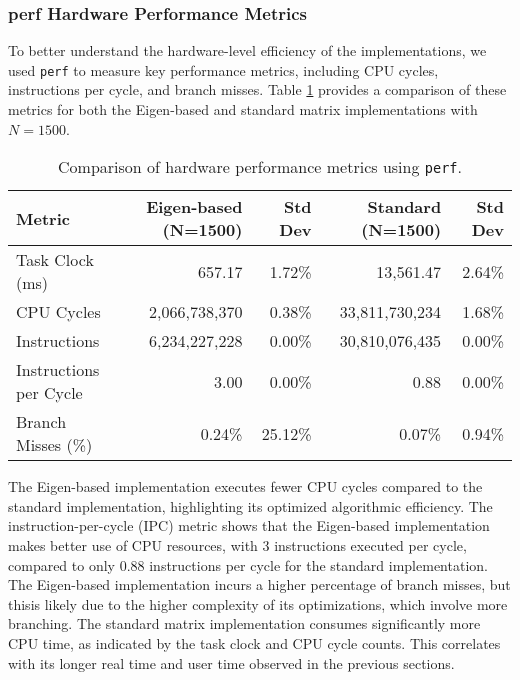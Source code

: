 \documentclass{article}
\begin{document}
    \subsubsection{perf Hardware Performance Metrics}

    To better understand the hardware-level efficiency of the implementations, we used \texttt{perf}
    to measure key performance metrics, including CPU cycles, instructions per cycle, and branch
    misses. Table \ref{tab:perf} provides a comparison of these metrics for both the Eigen-based and
    standard matrix implementations with $N=1500$.

    \begin{table}[h!]
        \centering
        \begin{tabular}{|l|r|r|r|r|}
            \hline
            \textbf{Metric} & \textbf{Eigen-based (N=1500)} & \textbf{Std Dev} & \textbf{Standard (N=1500)} & \textbf{Std Dev} \\ \hline
            Task Clock (ms) & 657.17 & 1.72\% & 13,561.47 & 2.64\% \\ \hline
            CPU Cycles & 2,066,738,370 & 0.38\% & 33,811,730,234 & 1.68\% \\ \hline
            Instructions & 6,234,227,228 & 0.00\% & 30,810,076,435 & 0.00\% \\ \hline
            Instructions per Cycle & 3.00 & 0.00\% & 0.88 & 0.00\% \\ \hline
            Branch Misses (\%) & 0.24\% & 25.12\% & 0.07\% & 0.94\% \\ \hline
        \end{tabular}
        \caption{Comparison of hardware performance metrics using \texttt{perf}.}
        \label{tab:perf}
    \end{table}

        The Eigen-based implementation executes fewer CPU cycles compared to the standard implementation, highlighting its optimized algorithmic efficiency. The instruction-per-cycle (IPC) metric shows that the Eigen-based implementation makes better use of CPU resources, with 3 instructions executed per cycle, compared to only 0.88 instructions per cycle for the standard implementation. The Eigen-based implementation incurs a higher percentage of branch misses, but thisis likely due to the higher complexity of its optimizations, which involve more branching. The standard matrix implementation consumes significantly more CPU time, as indicated
        by the task clock and CPU cycle counts. This correlates with its longer real time and user time observed in the previous sections.
\end{document}

